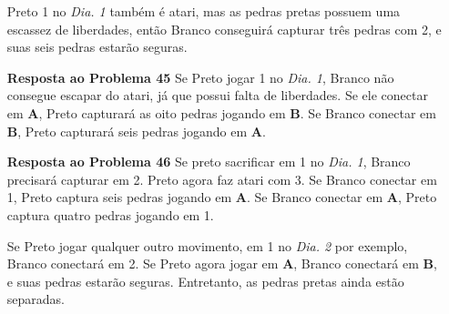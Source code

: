 \begin{itemize}
        Preto 1 no \emph{Dia. 1} também é atari, mas as pedras pretas possuem uma escassez de liberdades, então Branco conseguirá capturar três pedras com 2, e suas seis pedras estarão seguras.
    \item[\textbf{Resposta ao Problema 45}] Se Preto jogar 1 no \emph{Dia. 1}, Branco não consegue escapar do atari, já que possui falta de liberdades. Se ele conectar em \textbf{A}, Preto capturará as oito pedras jogando em \textbf{B}. Se Branco conectar em \textbf{B}, Preto capturará seis pedras jogando em \textbf{A}.
    \item[\textbf{Resposta ao Problema 46}] Se preto sacrificar em 1 no \emph{Dia. 1}, Branco precisará capturar em 2. Preto agora faz atari com 3. Se Branco conectar em 1, Preto captura seis pedras jogando em \textbf{A}. Se Branco conectar em \textbf{A}, Preto captura quatro pedras jogando em 1.
    
        Se Preto jogar qualquer outro movimento, em 1 no \emph{Dia. 2} por exemplo, Branco conectará em 2. Se Preto agora jogar em \textbf{A}, Branco conectará em \textbf{B}, e suas pedras estarão seguras. Entretanto, as pedras pretas ainda estão separadas.
\end{itemize}
